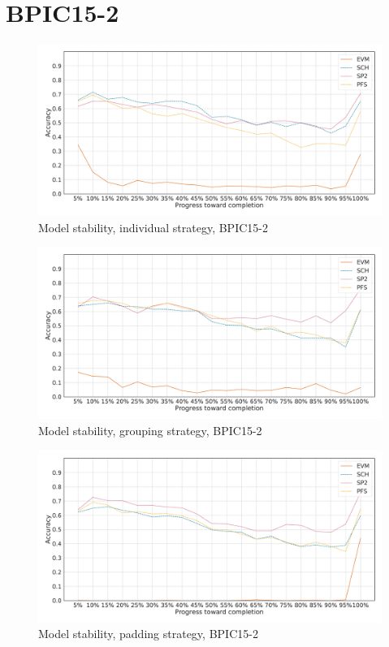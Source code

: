 \section*{BPIC15-2}
\begin{figure}[!htb]
    \centering
    \includegraphics[width=\textwidth]{gfx/bpic2015_2/individual_stability.pdf}
    \caption{Model stability, individual strategy, BPIC15-2}
    \label{fig:bpic15-2-individual-stability}
\end{figure}
\begin{figure}[!htb]
    \centering
    \includegraphics[width=\textwidth]{gfx/bpic2015_2/grouped_stability.pdf}
    \caption{Model stability, grouping strategy, BPIC15-2}
    \label{fig:bpic15-2-grouped-stability}
\end{figure}
\begin{figure}[!htb]
    \centering
    \includegraphics[width=\textwidth]{gfx/bpic2015_2/padded_stability.pdf}
    \caption{Model stability, padding strategy, BPIC15-2}
    \label{fig:bpic15-2-padded-stability}
\end{figure}
